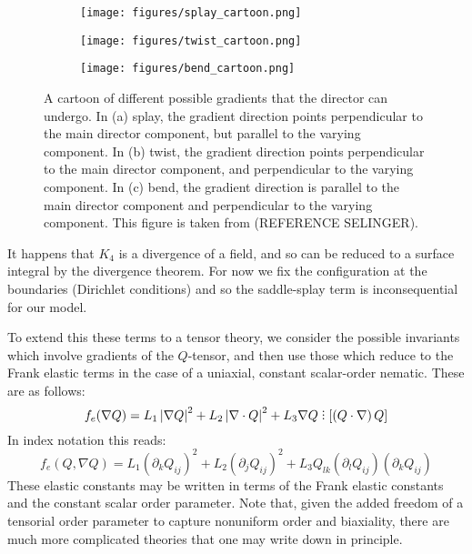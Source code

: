 \documentclass[reqno]{article}
\DeclareRobustCommand{\divby}{%
  \mathrel{\vbox{\baselineskip.65ex\lineskiplimit0pt\hbox{.}\hbox{.}\hbox{.}}}%
}
\begin{document}
  \begin{figure}[h]
    \centering
    \begin{subfigure}{0.45\textwidth}
      \texttt{[image: figures/splay\_cartoon.png]}
      \caption{}
      \label{fig:splay-cartoon}
    \end{subfigure}
    \hfill
    \begin{subfigure}{0.45\textwidth}
      \texttt{[image: figures/twist\_cartoon.png]}
      \caption{}
      \label{fig:twist-cartoon}
    \end{subfigure}
    \hfill
    \begin{subfigure}{0.45\textwidth}
      \texttt{[image: figures/bend\_cartoon.png]}
      \caption{}
      \label{fig:bend-cartoon}
    \end{subfigure}
    \caption{A cartoon of different possible gradients that the director can
      undergo. In (a) splay, the gradient direction points perpendicular to the
      main director component, but parallel to the varying component. In (b)
      twist, the gradient direction points perpendicular to the main director
      component, and perpendicular to the varying component. In (c) bend, the
      gradient direction is parallel to the main director component and
      perpendicular to the varying component. This figure is taken from
      (REFERENCE SELINGER).}
    \label{fig:deformation-cartoon}
  \end{figure}
  It happens that $K_4$ is a divergence of a field, and so can be reduced to a
  surface integral by the divergence theorem.
  For now we fix the configuration at the boundaries (Dirichlet conditions) and
  so the saddle-splay term is inconsequential for our model.

  To extend this these terms to a tensor theory, we consider the possible
  invariants which involve gradients of the $Q$-tensor, and then use those which
  reduce to the Frank elastic terms in the case of a uniaxial, constant
  scalar-order nematic.
  These are as follows:
  \begin{equation} \label{eq:elastic-free-energy}
    f_e (\nabla Q)
    = L_1 \left| \nabla Q \right|^2
    + L_2 \left| \nabla \cdot Q \right|^2
    + L_3 \nabla Q  \divby \left[ \left( Q \cdot \nabla \right) Q \right]
  \end{equation}
  In index notation this reads:
  \begin{equation}
    f_e (Q, \nabla Q)
    =
    L_1 \left( \partial_k Q_{ij} \right)^2
    + L_2 \left( \partial_j Q_{ij} \right)^2
    + L_3 Q_{lk} \left( \partial_{l} Q_{ij} \right) \left( \partial_k Q_{ij} \right)
  \end{equation}
  These elastic constants may be written in terms of the Frank elastic constants
  and the constant scalar order parameter.
  Note that, given the added freedom of a tensorial order parameter to capture
  nonuniform order and biaxiality, there are much more complicated theories that
  one may write down in principle.
  
\end{document}
